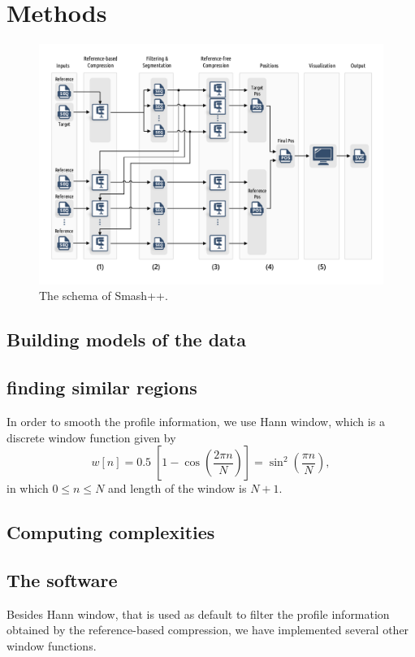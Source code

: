\clearpage
\section{Methods}
\label{sec.methods}

\begin{figure}[!h]
\includegraphics[width=\linewidth]{schema.pdf}
\caption{The schema of Smash++.}
\label{fig.schema}
\end{figure}

\subsection{Building models of the data}

\subsection{finding similar regions}

In order to smooth the profile information, we use Hann window, which is a discrete window function given by
\begin{equation}
  \label{eq.hann}
  w[n]=0.5\;\left[1-\cos \left({\frac {2\pi n}{N}}\right)\right]=\sin ^{2}\left({\frac {\pi n}{N}}\right),
\end{equation}
in which $0\le n\le N$ and length of the window is $N+1$.

\subsection{Computing complexities}

\subsection{The software}

Besides Hann window, that is used as default to filter the profile information obtained by the reference-based compression, we have implemented several other window functions.


